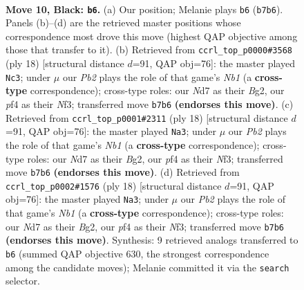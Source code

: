 \documentclass[11pt]{article}
\begin{document}
\clearpage

\begin{figure}[p]\centering
\begin{subfigure}{0.46\textwidth}\centering
\resizebox{\linewidth}{!}{%
\newchessgame
\chessboard[
  setfen={rnb2rk1/1ppn1ppp/p3p3/3pP3/1q1P1P1P/2N5/PPP2KP1/1R1Q1BNR b - - 4 10},
  showmover=false,
  pgfstyle=straightmove, color=movearrow, markmove={b7-b6}
]}
\caption{}
\end{subfigure}\hfill
\begin{subfigure}{0.46\textwidth}\centering
\resizebox{\linewidth}{!}{%
\newchessgame
\chessboard[
  setfen={1rbqk2r/ppp2ppp/2n1p3/8/QnpP4/5NP1/PP2PPBP/RN3RK1 w k - 2 10},
  showmover=false,
  pgfstyle=straightmove, color=movearrow, markmove={b1-c3}
]}
\caption{}
\end{subfigure}
\\[4pt]
\begin{subfigure}{0.46\textwidth}\centering
\resizebox{\linewidth}{!}{%
\newchessgame
\chessboard[
  setfen={1rbqk2r/ppp2ppp/2n1p3/8/QnpP4/5NP1/PP2PPBP/RN3RK1 w k - 2 10},
  showmover=false,
  pgfstyle=straightmove, color=movearrow, markmove={b1-a3}
]}
\caption{}
\end{subfigure}\hfill
\begin{subfigure}{0.46\textwidth}\centering
\resizebox{\linewidth}{!}{%
\newchessgame
\chessboard[
  setfen={1rbqk2r/ppp2ppp/2n1p3/8/QnpP4/5NP1/PP2PPBP/RN3RK1 w k - 2 10},
  showmover=false,
  pgfstyle=straightmove, color=movearrow, markmove={b1-a3}
]}
\caption{}
\end{subfigure}
\caption{\textbf{Move 10, Black: \texttt{b6}.} (a) Our position; Melanie plays \texttt{b6} (\texttt{b7b6}). Panels (b)--(d) are the retrieved master positions whose correspondence most drove this move (highest QAP objective among those that transfer to it). (b) Retrieved from \texttt{ccrl\_top\_p0000\#3568} (ply 18) [structural distance $d$=91, QAP obj=76]: the master played \texttt{Nc3}; under $\mu$ our \emph{Pb2} plays the role of that game's \emph{Nb1} (a \textbf{cross-type} correspondence); cross-type roles: our \emph{N}d7 as their \emph{B}g2, our \emph{p}f4 as their \emph{N}f3; transferred move \texttt{b7b6} \textbf{(endorses this move)}. (c) Retrieved from \texttt{ccrl\_top\_p0001\#2311} (ply 18) [structural distance $d$=91, QAP obj=76]: the master played \texttt{Na3}; under $\mu$ our \emph{Pb2} plays the role of that game's \emph{Nb1} (a \textbf{cross-type} correspondence); cross-type roles: our \emph{N}d7 as their \emph{B}g2, our \emph{p}f4 as their \emph{N}f3; transferred move \texttt{b7b6} \textbf{(endorses this move)}. (d) Retrieved from \texttt{ccrl\_top\_p0002\#1576} (ply 18) [structural distance $d$=91, QAP obj=76]: the master played \texttt{Na3}; under $\mu$ our \emph{Pb2} plays the role of that game's \emph{Nb1} (a \textbf{cross-type} correspondence); cross-type roles: our \emph{N}d7 as their \emph{B}g2, our \emph{p}f4 as their \emph{N}f3; transferred move \texttt{b7b6} \textbf{(endorses this move)}. Synthesis: 9 retrieved analogs transferred to \texttt{b6} (summed QAP objective 630, the strongest correspondence among the candidate moves); Melanie committed it via the \texttt{search} selector.}
\label{fig:thought-m19}
\end{figure}
\end{document}

